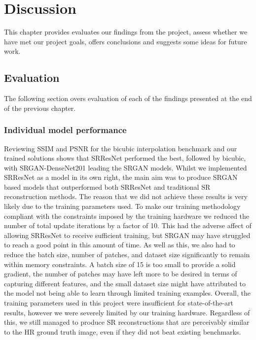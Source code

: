 \chapter{Discussion}
\label{chapter4}
This chapter provides evaluates our findings from the project, assess whether we have met our project goals, offers conclusions and suggests some ideas for future work.

\section{Evaluation}
The following section overs evaluation of each of the findings presented at the end of the previous chapter.

\subsection{Individual model performance}
Reviewing SSIM and PSNR for the bicubic interpolation benchmark and our trained solutions shows that SRResNet performed the best, followed by bicubic, with SRGAN-DenseNet201 leading the SRGAN models. Whilst we implemented SRResNet as a model in its own right, the main aim was to produce SRGAN based models that outperformed both SRResNet and traditional SR reconstruction methods. The reason that we did not achieve these results is very likely due to the training parameters used. To make our training methodology compliant with the constraints imposed by the training hardware we reduced the number of total update iterations by a factor of 10. This had the adverse affect of allowing SRResNet to receive sufficient training, but SRGAN may have struggled to reach a good point in this amount of time. As well as this, we also had to reduce the batch size, number of patches, and dataset size significantly to remain within memory constraints. A batch size of 15 is too small to provide a solid gradient, the number of patches may have left more to be desired in terms of capturing different features, and the small dataset size might have attributed to the model not being able to learn through limited training examples. Overall, the training parameters used in this project were insufficient for state-of-the-art results, however we were severely limited by our training hardware. Regardless of this, we still managed to produce SR reconstructions that are perceivably similar to the HR ground truth image, even if they did not beat existing benchmarks.

